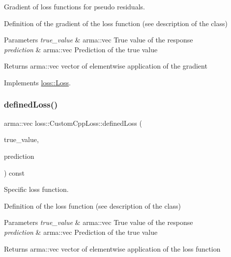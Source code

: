 Gradient of loss functions for pseudo residuals. 

Definition of the gradient of the loss function (see description of the class)


\begin{DoxyParams}{Parameters}
{\em true\+\_\+value} & {\ttfamily arma\+::vec} True value of the response \\
\hline
{\em prediction} & {\ttfamily arma\+::vec} Prediction of the true value\\
\hline
\end{DoxyParams}
\begin{DoxyReturn}{Returns}
{\ttfamily arma\+::vec} vector of elementwise application of the gradient 
\end{DoxyReturn}


Implements \mbox{\hyperlink{classloss_1_1_loss_a267a4de70747ade4b2d84ce35a448979}{loss\+::\+Loss}}.

\mbox{\label{classloss_1_1_custom_cpp_loss_a5611805b67b0542449beb898051ab943}} 
\subsubsection{\texorpdfstring{defined\+Loss()}{definedLoss()}}
{\footnotesize\ttfamily arma\+::vec loss\+::\+Custom\+Cpp\+Loss\+::defined\+Loss (\begin{DoxyParamCaption}\item[{const arma\+::vec \&}]{true\+\_\+value,  }\item[{const arma\+::vec \&}]{prediction }\end{DoxyParamCaption}) const\hspace{0.3cm}{\ttfamily [virtual]}}



Specific loss function. 

Definition of the loss function (see description of the class)


\begin{DoxyParams}{Parameters}
{\em true\+\_\+value} & {\ttfamily arma\+::vec} True value of the response \\
\hline
{\em prediction} & {\ttfamily arma\+::vec} Prediction of the true value\\
\hline
\end{DoxyParams}
\begin{DoxyReturn}{Returns}
{\ttfamily arma\+::vec} vector of elementwise application of the loss function 
\end{DoxyReturn}


